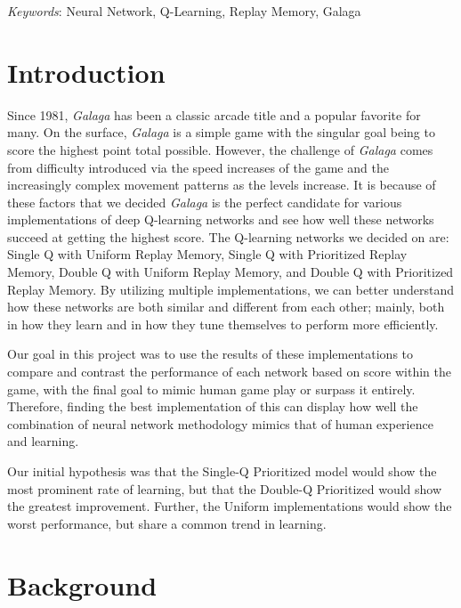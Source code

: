 \documentclass[conference]{IEEEtran}
\begin{document}
\begin{keywords}
\textit{Keywords}: Neural Network, Q-Learning, Replay Memory, Galaga
\end{keywords}

\section{Introduction}

Since 1981, \textit{Galaga} has been a classic arcade title and a popular favorite for many. On the surface, \textit{Galaga} is a simple game with the singular goal being to score the highest point total possible. However, the challenge of \textit{Galaga} comes from difficulty introduced via the speed increases of the game and the increasingly complex movement patterns as the levels increase. It is because of these factors that we decided \textit{Galaga} is the perfect candidate for various implementations of deep Q-learning networks and see how well these networks succeed at getting the highest score. The Q-learning networks we decided on are: Single Q with Uniform Replay Memory, Single Q with Prioritized Replay Memory, Double Q with Uniform Replay Memory, and Double Q with Prioritized Replay Memory. By utilizing multiple implementations, we can better understand how these networks are both similar and different from each other; mainly, both in how they learn and in how they tune themselves to perform more efficiently. \par
Our goal in this project was to use the results of these implementations to compare and contrast the performance of each network based on score within the game, with the final goal to mimic human game play or surpass it entirely. Therefore, finding the best implementation of this can display how well the combination of neural network methodology mimics that of human experience and learning. \par
Our initial hypothesis was that the Single-Q Prioritized model would show the most prominent rate of learning, but that the Double-Q Prioritized would show the greatest improvement. Further, the Uniform implementations would show the worst performance, but share a common trend in learning. 

\section{Background}
\end{document}
